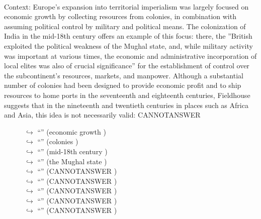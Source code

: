 \documentclass[11pt,a4paper, onecolumn]{article}
\begin{document}
\\ Context: Europe's expansion into territorial imperialism was largely focused on economic growth by collecting resources from colonies, in combination with assuming political control by military and political means. The colonization of India in the mid-18th century offers an example of this focus: there, the ''British exploited the political weakness of the Mughal state, and, while military activity was important at various times, the economic and administrative incorporation of local elites was also of crucial significance'' for the establishment of control over the subcontinent's resources, markets, and manpower. Although a substantial number of colonies had been designed to provide economic profit and to ship resources to home ports in the seventeenth and eighteenth centuries, Fieldhouse suggests that in the nineteenth and twentieth centuries in places such as Africa and Asia, this idea is not necessarily valid: CANNOTANSWER

\begin{figure}[t] \small \begin{tcolorbox}[boxsep=0pt,left=5pt,right=0pt,top=2pt,colback = yellow!5] \begin{dialogue}
 \small 
\colorbox{pink!25}{$\hookrightarrow$}
{ ``'' (economic growth ) }
\\
\colorbox{pink!25}{$\hookrightarrow$}
{ ``'' (colonies ) }
\\
\colorbox{pink!25}{$\hookrightarrow$}
{ ``'' (mid-18th century ) }
\\
\colorbox{pink!25}{$\hookrightarrow$}
{ ``'' (the Mughal state ) }
\\
\colorbox{pink!25}{$\hookrightarrow$}
{ ``'' (CANNOTANSWER ) }
\\
\colorbox{pink!25}{$\hookrightarrow$}
{ ``'' (CANNOTANSWER ) }
\\
\colorbox{pink!25}{$\hookrightarrow$}
{ ``'' (CANNOTANSWER ) }
\\
\colorbox{pink!25}{$\hookrightarrow$}
{ ``'' (CANNOTANSWER ) }
\\
\colorbox{pink!25}{$\hookrightarrow$}
{ ``'' (CANNOTANSWER ) }
\\
 \end{dialogue}\end{tcolorbox}\end{figure}
\end{document}
